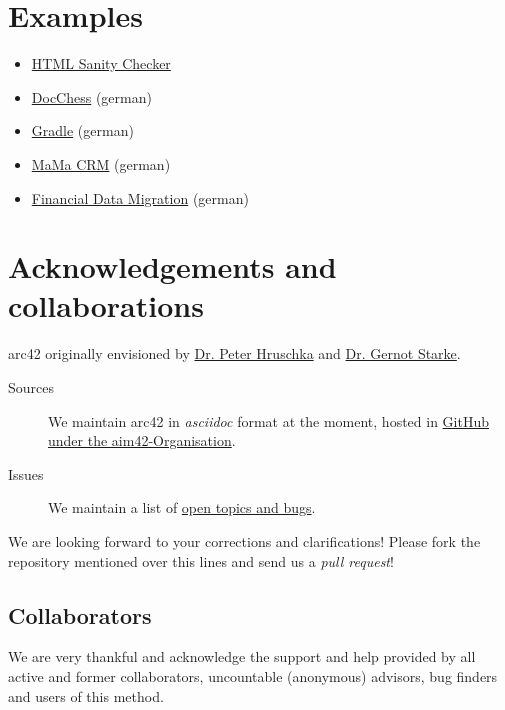 \documentclass[]{article}
\begin{document}
\section{Examples}

\begin{itemize}
\item
  \href{http://aim42.github.io/htmlSanityCheck/hsc_arc42.html}{HTML
  Sanity Checker}
\item
  \href{http://www.dokchess.de/dokchess/arc42/}{DocChess} (german)
\item
  \href{http://www.embarc.de/arc42-starschnitt-gradle/}{Gradle} (german)
\item
  \href{http://confluence.arc42.org/display/arc42beispielmamacrm}{MaMa
  CRM} (german)
\item
  \href{http://confluence.arc42.org/display/migrationEg/Financial+Data+Migration}{Financial
  Data Migration} (german)
\end{itemize}

\section{Acknowledgements and collaborations}

arc42 originally envisioned by \href{http://b-agile.de}{Dr. Peter
Hruschka} and \href{http://gernotstarke.de}{Dr. Gernot Starke}.

\begin{description}
\item[Sources]
We maintain arc42 in \emph{asciidoc} format at the moment, hosted in
\href{https://github.com/aim42/aim42}{GitHub under the
aim42-Organisation}.
\item[Issues]
We maintain a list of
\href{https://github.com/arc42/arc42-template/issues}{open topics and
bugs}.
\end{description}

We are looking forward to your corrections and clarifications! Please
fork the repository mentioned over this lines and send us a \emph{pull
request}!

\subsection{Collaborators}

We are very thankful and acknowledge the support and help provided by
all active and former collaborators, uncountable (anonymous) advisors,
bug finders and users of this method.
\end{document}

